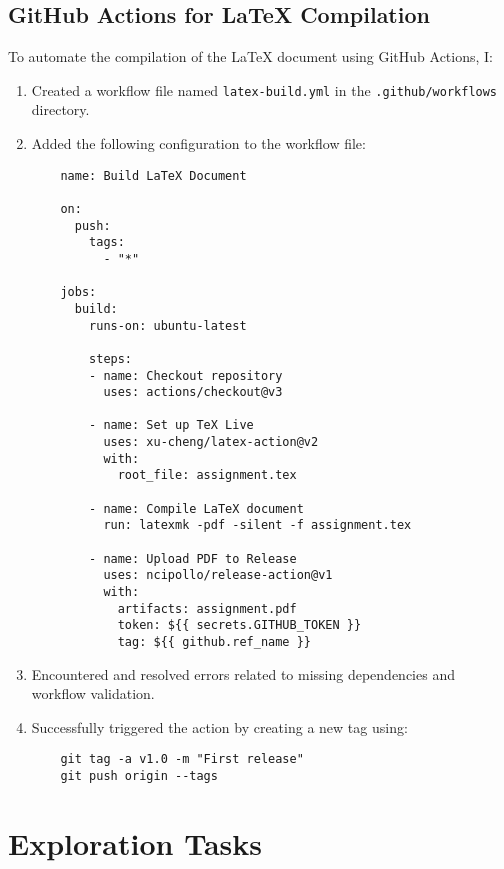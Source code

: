 \documentclass[12pt,a4paper]{article}
\begin{document}
\subsection{GitHub Actions for LaTeX Compilation}
To automate the compilation of the LaTeX document using GitHub Actions, I:
\begin{enumerate}
    \item Created a workflow file named \texttt{latex-build.yml} in the \texttt{.github/workflows} directory.
    \item Added the following configuration to the workflow file:
    \begin{verbatim}
    name: Build LaTeX Document

    on:
      push:
        tags:
          - "*"

    jobs:
      build:
        runs-on: ubuntu-latest

        steps:
        - name: Checkout repository
          uses: actions/checkout@v3

        - name: Set up TeX Live
          uses: xu-cheng/latex-action@v2
          with:
            root_file: assignment.tex

        - name: Compile LaTeX document
          run: latexmk -pdf -silent -f assignment.tex

        - name: Upload PDF to Release
          uses: ncipollo/release-action@v1
          with:
            artifacts: assignment.pdf
            token: ${{ secrets.GITHUB_TOKEN }}
            tag: ${{ github.ref_name }}
    \end{verbatim}
    \item Encountered and resolved errors related to missing dependencies and workflow validation.
    \item Successfully triggered the action by creating a new tag using:
    \begin{verbatim}
    git tag -a v1.0 -m "First release"
    git push origin --tags
    \end{verbatim}
\end{enumerate}

\section{Exploration Tasks}
\end{document}
